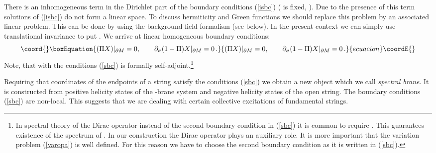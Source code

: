 \documentclass[a4paper,12pt,twoside]{article}
\begin{document}
There is an inhomogeneous term in the Dirichlet
part of the boundary conditions (\ref{isbc}) \coordHE{}
(\coordHE{} is fixed, \coordHE{}). Due to the presence of
this term solutions of (\ref{isbc}) do not form a linear space.
To discuss hermiticity and Green functions we should
replace this problem by an associated linear problem. This can be
done by using the background field formalism (see below).
In the present context we can simply use translational
invariance to put \coordHE{}. We arrive at linear homogeneous
boundary conditions:
\begin{equation}\coord{}\boxEquation{
(\Pi X)|_{\partial M}=0,\qquad 
\partial_\sigma (1-\Pi )X |_{\partial M}=0 \,.\label{sbc}
}{
(\Pi X)|_{\partial M}=0,\qquad 
\partial_\sigma (1-\Pi )X |_{\partial M}=0 \,.}{ecuacion}\coordE{}\end{equation}
Note, that with the conditions (\ref{sbc}) \myHighlight{$\Delta$}\coordHE{}
is formally self-adjoint.\footnote{In spectral theory of the Dirac
operator instead of the second boundary
condition in (\ref{sbc}) it is common to require \coordHE{}.
This guarantees existence of the spectrum of \coordHE{}. In our construction
the Dirac operator plays an auxiliary role. It is more important that
the variation problem (\ref{varopa}) is well defined. For this reason
we have to choose the second boundary condition as it is written
in (\ref{sbc}).}

Requiring that  coordinates of the endpoints of a 
string satisfy the conditions (\ref{sbc}) we
obtain a new object which we call {\it spectral brane}.
It is constructed from positive helicity states of
the \coordHE{}-brane system and negative helicity states
of the open string. The boundary conditions (\ref{sbc})
are non-local. This suggests that we are dealing
with certain collective excitations of fundamental
strings.
\end{document}
